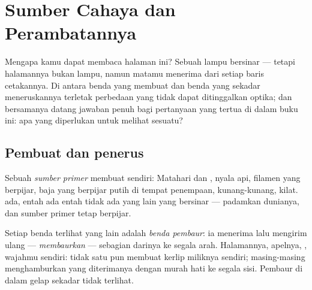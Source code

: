 \chapter{Sumber Cahaya dan Perambatannya}\label{ch:g7:light-sources-propagation}

Mengapa kamu dapat membaca halaman ini? Sebuah lampu bersinar ---
tetapi halamannya bukan lampu, namun matamu menerima  dari
setiap baris cetakannya. Di antara benda yang membuat  dan benda
yang sekadar meneruskannya terletak perbedaan yang tidak dapat
ditinggalkan optika; dan bersamanya datang jawaban penuh bagi
pertanyaan yang tertua di dalam buku ini: apa yang diperlukan untuk
melihat sesuatu?

\section{Pembuat dan penerus}

\begin{definition}\label{def:g7:light-sources-propagation:primary}
Sebuah \emph{sumber primer} membuat 
sendiri: Matahari dan , nyala api, filamen yang berpijar, baja
yang berpijar putih di tempat penempaan, kunang-kunang, kilat.
 ada, entah ada entah tidak ada yang lain yang bersinar ---
padamkan dunianya, dan sumber primer tetap berpijar.
\end{definition}

\begin{definition}\label{def:g7:light-sources-propagation:diffusion}
Setiap benda terlihat yang lain adalah \emph{benda
pembaur}: ia menerima  lalu mengirim ulang ---
\emph{membaurkan} --- sebagian darinya ke segala arah. Halamannya,
apelnya, , wajahmu sendiri: tidak satu pun membuat kerlip
miliknya sendiri; masing-masing menghamburkan  yang diterimanya
dengan murah hati ke segala sisi. Pembaur di dalam gelap sekadar tidak
terlihat.
\end{definition}

